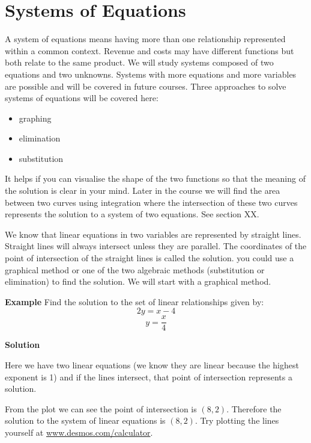 
 \section{Systems of Equations}
 A system of equations means having more than one relationship represented within a common context. Revenue and costs may have different functions but both relate to the same product. We will study systems composed of two equations and two unknowns. Systems with more equations and more variables are possible and will be covered in future courses. Three approaches to solve systems of equations will be covered here:
 \begin{itemize}
 	\setlength\itemsep{0em}
 	\item graphing
 	\item elimination
 	\item substitution
 \end{itemize}
 
It helps if you can visualise the shape of the two functions so that the meaning of the solution is clear in your mind. Later in the course we will find the area between two curves using integration where the intersection of these two curves represents the solution to a system of two equations. See section XX.
 
 We know that linear equations in two variables are represented by straight lines. Straight
 lines will always intersect unless they are parallel. The coordinates of the point of intersection of the straight lines is called the solution. you could use a graphical method or one of the two algebraic methods (substitution or elimination) to find the solution.  We will start with a graphical method. 
 
 \textbf{Example} Find the solution to the set of linear relationships given by:
 $$2y=x-4$$
 $$y=\frac{x}{4}$$
  \begin{multicols}{2}
 \textbf{Solution} 
 	
 	Here we have two linear equations (we know they are linear because the highest exponent is 1) and if the lines intersect, that point of intersection represents a solution. 
 	
 	From the plot we can see the point of intersection is $(8,2)$. Therefore the solution to the system of linear equations is $(8,2)$. Try plotting the lines yourself at \url{www.desmos.com/calculator}.
 	\columnbreak
 \begin{center}
\end{center}
\end{multicols}
 
